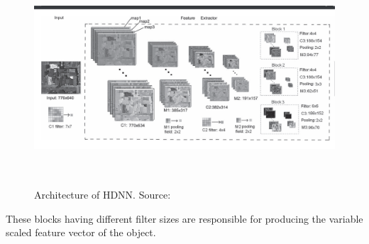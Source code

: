 \begin{figure}[!htbp]
\centerline{\includegraphics[height=80mm,width=140mm]{img/fig12.png}}
\caption{Architecture of HDNN. Source: \cite{b8}}
\label{fig12}
\end{figure}

\par These blocks having different filter sizes are responsible for producing the variable scaled feature vector of the object. 